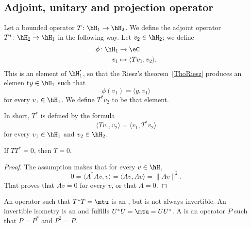 \subsection{Adjoint, unitary and projection operator}

Let a bounded operator \( T\colon \hH_1\to \hH_2\). We define the adjoint operator \(T^*\colon \hH_2\to \hH_1\) in the following way. Let \( v_2\in \hH_2\); we define
\begin{equation}
    \begin{aligned}
        \phi\colon \hH_1 &\to \eC \\
        v_1&\mapsto \langle Tv_1, v_2\rangle.
    \end{aligned}
\end{equation}
This is an element of \( \hH_1'\), so that the Riesz's theorem~\ref{ThoRiesz} produces an elemen t\( y\in \hH_1\) such that
\begin{equation}
    \phi(v_1)=\langle y, v_1\rangle
\end{equation}
for every \( v_1\in \hH_1\). We define \( T^*v_2\) to be that element.

\begin{definition}      \label{DEFooERIYooIIRLuy}
    In short, \( T^*\) is defined by the formula
    \begin{equation}
    \langle Tv_1, v_2\rangle =\langle v_1, T^*v_2\rangle
    \end{equation}
    for every \( v_1\in \hH_1\) and \( v_2\in\hH_2\).
\end{definition}

\begin{lemma}			\label{LemTTzepoT}
If $TT^*=0$, then $T=0$.
\end{lemma}

\begin{proof}
The assumption makes that for every $v\in\hH$,
\begin{equation}
0=\langle A^*Av, v\rangle =\langle Av, Av\rangle =\| Av \|^2.
\end{equation}
 That proves that $Av=0$ for every $v$, or that $A=0$.
\end{proof}

An operator such that $T^*T=\mtu$ is an , but is not always invertible. An invertible isometry is an  and fulfills $U^*U=\mtu=UU^*$. A  is an operator $P$ such that $P=P^*$ and $P^2=P$.

